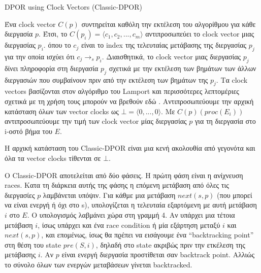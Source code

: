 \begin{algorithm}
    \caption{DPOR using Clock Vectors (Classic-DPOR)}
    \label{DPORV}
\end{algorithm}

Ένα clock vector $C(p)$ συντηρείται καθόλη την εκτέλεση του αλγορίθμου για κάθε
διεργασία $p$. Έτσι, το $C(p_i) = \langle c_1, c_2, ..., c_m \rangle$
αντιπροσωπεύει το clock vector μιας διεργασίας $p_i$.
όπου το $c_j$ είναι το  index της τελευταίας μετάβασης της διεργασίας $p_j$ για την οποία ισχύει ότι
$c_j \rightarrow_s p_i$. Διαισθητικά, το clock vector μιας διεργασίας $p_j$ δίνει πληροφορία στη διεργασία $p_j$ σχετικά με την εκτέλεση των βημάτων των άλλων διεργασιών που 
συμβαίνουν πριν από την εκτέλεση των βημάτων της $p_j$. Τα clock vectors βασίζονται στον αλγόριθμο του Lamport \cite{Lamport@CACM-89} και περισσότερες λεπτομέριες 
σχετικά με τη χρήση τους μπορούν να βρεθούν εδώ \cite{FlanaganDPOR}. 
Αντιπροσωπεύουμε την αρχική κατάσταση όλων των vector clocks ως $\bot = \langle 0, ..., 0 \rangle$. Με $C(p)(proc(E_i ))$ αντιπροσωπεύουμε την τιμή των 
clock vector μίας διεργασίας $p$ για τη διεργασία στο i-οστό βήμα του $E$.

Η αρχική κατάσταση του Classic-DPOR είναι μια κενή ακολουθία από γεγονότα και όλα τα vector clocks τίθενται σε $\bot$.

Ο Classic-DPOR αποτελείται από δύο φάσεις. Η πρώτη φάση είναι η ανίχνευση races. Κατα τη διάρκεια αυτής της φάσης η επόμενη μετάβαση από όλες τις διεργασίες $p$ λαμβάνεται υπόψιν.
Για κάθμε μια μετάβαση $next(s, p)$ (που μπορεί να είναι ενεργή ή όχι στο s), υπολογίζεται η τελευταία εξαρτόμενη με αυτή μετάβαση $i$ στο $E$.
Ο υπολογισμός λαβμάνει χώρα στη γραμμή 4.
Αν υπάρχει μια τέτοια μετάβαση $i$, ίσως υπάρχει και ένα race
condition ή μία εξάρτηση μεταξύ $i$ και $next(s, p)$, και επομένως, ίσως θα πϱέπει να εισάγουμε ένα “backtracking point” στη θέση του 
state $pre(S, i)$, δηλαδή στο state ακριβώς πριν την ετκέλεση της μετάβασης $i$. Αν $p$ είναι ενεργή διεργασία προστίθεται σαν backtrack point. Αλλιώς το σύνολο όλων των ενεργών 
μεταβάσεων γίνεται backtracked.

